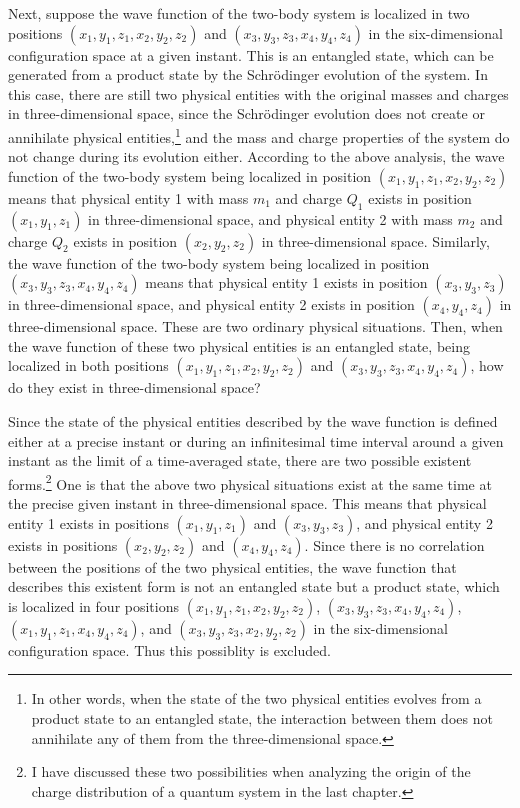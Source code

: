 Next, suppose the wave function of the two-body system is localized in two positions $(x_1, y_1, z_1, x_2, y_2, z_2)$ and $(x_3, y_3, z_3, x_4, y_4, z_4)$ in the six-dimensional configuration space at a given instant. This is an entangled state, which can be generated from a product state by the Schr\"{o}dinger evolution of the system. In this case, there are still two physical entities with the original masses and charges in three-dimensional space, since the Schr\"{o}dinger evolution does not create or annihilate physical entities,\footnote{In other words, when the state of the two physical entities evolves from a product state to an entangled state, the interaction between them does not annihilate any of them from the three-dimensional space.} and the mass and charge properties of the system do not change during its evolution either. 
According to the above analysis, the wave function of the two-body system being localized in position $(x_1, y_1, z_1, x_2, y_2, z_2)$ means that physical entity 1 with mass $m_1$ and charge $Q_1$ exists in position $(x_1,y_1,z_1)$ in three-dimensional space, and physical entity 2 with mass $m_2$ and charge $Q_2$ exists in position $(x_2,y_2,z_2)$ in three-dimensional space. Similarly, the wave function of the two-body system being localized in position $(x_3, y_3, z_3, x_4, y_4, z_4)$ means that physical entity 1 exists in position $(x_3, y_3, z_3)$ in three-dimensional space, and physical entity 2 exists in position $(x_4, y_4, z_4)$ in three-dimensional space. These are two ordinary physical situations. Then, when the wave function of these two physical entities is an entangled state, being localized in both positions $(x_1, y_1, z_1, x_2, y_2, z_2)$ and $(x_3, y_3, z_3, x_4, y_4, z_4)$, how do they exist in three-dimensional space? 

Since the state of the physical entities described by the wave function is defined either at a precise instant or during an infinitesimal time interval around a given instant as the limit of a time-averaged state, there are two possible existent forms.\footnote{I have discussed these two possibilities when analyzing the origin of the charge distribution of a quantum system in the last chapter.} One is that the above two physical situations exist at the same time at the precise given instant in three-dimensional space. This means that physical entity 1 exists in positions $(x_1,y_1,z_1)$ and $(x_3, y_3, z_3)$, and physical entity 2 exists in positions $(x_2,y_2,z_2)$ and $(x_4, y_4, z_4)$. Since there is no correlation between the positions of the two physical entities, the wave function that describes this existent form is not an entangled state but a product state, which is localized in four positions $(x_1, y_1, z_1, x_2, y_2, z_2)$, $(x_3, y_3, z_3, x_4, y_4, z_4)$, $(x_1, y_1, z_1, x_4, y_4, z_4)$, and $(x_3, y_3, z_3, x_2, y_2, z_2)$ in the six-dimensional configuration space. Thus this possiblity is excluded.

